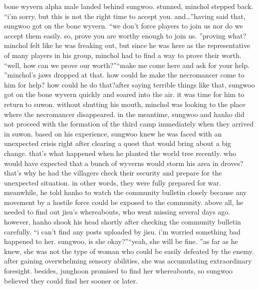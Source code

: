 bone wyvern alpha male landed behind sungwoo.
 stunned, minchol stepped back.
“i’m sorry, but this is not the right time to accept you.
 and…”having said that, sungwoo got on the bone wyvern.
“we don’t force players to join us nor do we accept them easily.
 so, prove you are worthy enough to join us.
”proving what? minchol felt like he was freaking out, but since he was here as the representative of many players in his group, minchol had to find a way to prove their worth.
“well, how can we prove our worth?”“make me come here and ask for your help.
”minchol’s jaws dropped at that.
 how could he make the necromancer come to him for help? how could he do that?after saying terrible things like that, sungwoo got on the bone wyvern quickly and soared into the air.
 it was time for him to return to suwon.
without shutting his mouth, minchol was looking to the place where the necromancer disappeared.
in the meantime, sungwoo and hanho did not proceed with the formation of the third camp immediately when they arrived in suwon.
based on his experience, sungwoo knew he was faced with an unexpected crisis right after clearing a quest that would bring about a big change.
 that’s what happened when he planted the world tree recently.
 who would have expected that a bunch of wyverns would storm his area in droves?that’s why he had the villagers check their security and prepare for the unexpected situation.
 in other words, they were fully prepared for war.
meanwhile, he told hanho to watch the community bulletin closely because any movement by a hostile force could be exposed to the community.
 above all, he needed to find out jisu’s whereabouts, who went missing several days ago.
however, hanho shook his head shortly after checking the community bulletin carefully.
“i can’t find any posts uploaded by jisu.
 i’m worried something bad happened to her.
 sungwoo, is she okay?”“yeah, she will be fine.
”as far as he knew, she was not the type of woman who could be easily defeated by the enemy.
 after gaining overwhelming sensory abilities, she was accumulating extraordinary foresight.
 besides, junghoon promised to find her whereabouts, so sungwoo believed they could find her sooner or later.


 